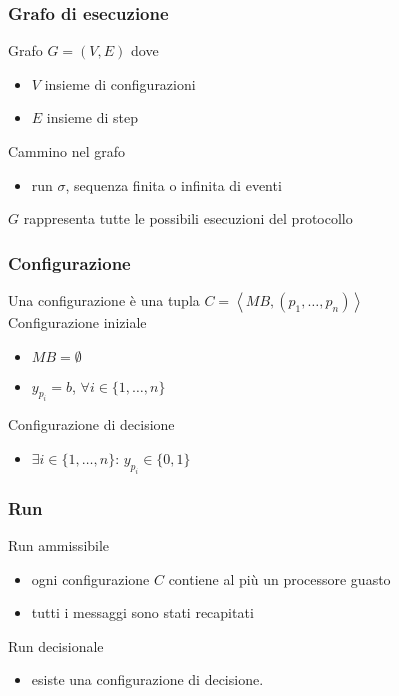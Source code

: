 \documentclass{beamer}
\begin{document}
\begin{frame}\frametitle{Grafo di esecuzione}
\begin{figure}\centering \end{figure}\vspace*{.25cm}
Grafo $G=(V,E)$ dove
\begin{itemize}
\item $V$ insieme di configurazioni
\item $E$ insieme di step
\end{itemize}
\vspace*{.25cm}
Cammino nel grafo
\begin{itemize}
\item run $\sigma$, sequenza finita o infinita di eventi
\end{itemize}
\vspace*{.25cm}
$G$ rappresenta tutte le possibili esecuzioni del protocollo
\end{frame}

\begin{frame}\frametitle{Configurazione}
Una configurazione è una tupla $C=\left<MB, (p_1,\ldots,p_n)\right>$\\\vspace*{.5cm}
Configurazione iniziale
\begin{itemize}
\item $MB=\emptyset$
\item $y_{p_i}=b$, $\forall i\in\{1,\ldots,n\}$
\end{itemize}
\vspace*{.25cm}
Configurazione di decisione
\begin{itemize}
\item $\exists i\in\{1,\ldots,n\}$: $y_{p_i}\in\{0,1\}$
\end{itemize}
\begin{figure}\centering\end{figure}
\end{frame}

\begin{frame}\frametitle{Run}
Run ammissibile
\begin{itemize}
\item ogni configurazione $C$ contiene al più un processore guasto
\item tutti i messaggi sono stati recapitati
\end{itemize}
\vspace*{0.25cm}
Run decisionale
\begin{itemize}
\item esiste una configurazione di decisione.
\end{itemize}
\end{frame}
\end{document}
